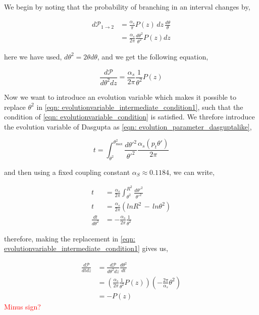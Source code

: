 \documentclass[main.tex]{subfiles}
\begin{document}
We begin by noting that the probability of branching in an interval changes by, 

\begin{align}
    d\mathcal{P}_{1\rightarrow 2} &= \frac{\alpha_s}{\pi} P(z) \, dz \, \frac{d\theta}{\theta} \nonumber \\
    &= \frac{\alpha_s}{2\pi} \frac{d\theta^2}{\theta^2} P(z) dz
\end{align}

here we have used, \(d\theta^2 =2\theta d\theta\), and we get the following equation, 

\begin{equation}\label{eqn: evolutionvariable_intermediate_condition1}
    \frac{d\mathcal{P}}{d\theta^2 dz} = \frac{\alpha_s}{2\pi} \frac{1}{\theta^2} P(z)
\end{equation}

Now we want to introduce an evolution variable which makes it possible to replace \(\theta^2\) in \autoref{eqn: evolutionvariable_intermediate_condition1}, such that the condition of \autoref{eqn: evolutionvariable_condition} is satisfied.
We threfore introduce the evolution variable of Dasgupta \cite{Dasgupta_2015} as \autoref{eqn: evolution_parameter_dasguptalike},

\begin{equation}\label{eqn: evolution_parameter_dasguptalike}
    t = \int _{\theta^2}^{\theta_\text{max}^2} \frac{d\theta'^2}{\theta'^2} \frac{\alpha_s(p_t \theta')}{2\pi} 
\end{equation}

and then using a fixed coupling constant \(\alpha_S \approx 0.1184\), we can write,

\begin{align} 
    t &= \frac{\alpha_s}{2\pi} \int_{\theta^2}^{R^2} \frac{d\theta'^2}{\theta'^2} \nonumber \\
    t&= \frac{\alpha_s}{2\pi} \left( ln R^2 \, - \, ln \theta^2\right) \nonumber \\
    \frac{dt}{d\theta^2} &= - \frac{\alpha_s}{2\pi} \frac{1}{\theta^2}
\end{align}

therefore, making the replacement in \autoref{eqn: evolutionvariable_intermediate_condition1} gives us,

\begin{align}
     \frac{d\mathcal{P}}{dt dz} &= \frac{d\mathcal{P}}{d\theta^2 dz} \frac{d\theta^2}{dt} \nonumber\\
    &= \left( \frac{\alpha_s}{2\pi} \frac{1}{\theta^2} P(z) \right) \left( -\frac{2\pi}{\alpha_s} \theta^2 \right) \nonumber \\
    &= -P(z)
\end{align}
\textcolor{red}{Minus sign?}
\end{document}
